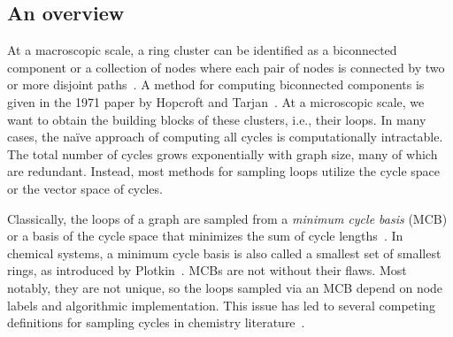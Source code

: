 \documentclass[fleqn,11pt]{article}
\begin{document}

\subsection{An overview}

At a macroscopic scale, a ring cluster can be identified as a biconnected component or a collection of nodes where each pair of nodes is connected by two or more disjoint paths~\cite{diestelGraph2017,bollobasModern1998}. A method for computing biconnected components is given in the 1971 paper by Hopcroft and Tarjan~\cite{hopcroftAlgorithm1973}. At a microscopic scale, we want to obtain the building blocks of these clusters, i.e., their loops. In many cases, the na\"ive approach of computing all cycles is computationally intractable. The total number of cycles grows exponentially with graph size, many of which are redundant. Instead, most methods for sampling loops utilize the cycle space or the vector space of cycles.

Classically, the loops of a graph are sampled from a \emph{minimum cycle basis} (MCB) or a basis of the cycle space that minimizes the sum of cycle lengths~\cite{kavithaCycle2009}. In chemical systems, a minimum cycle basis is also called a smallest set of smallest rings, as introduced by Plotkin~\cite{plotkinMathematical1971}. {MCBs} are not without their flaws. Most notably, they are not unique, so the loops sampled via an MCB depend on node labels and algorithmic implementation. This issue has led to several competing definitions for sampling cycles in chemistry literature~\cite{bergerCounterexamples2004}.
\end{document}

